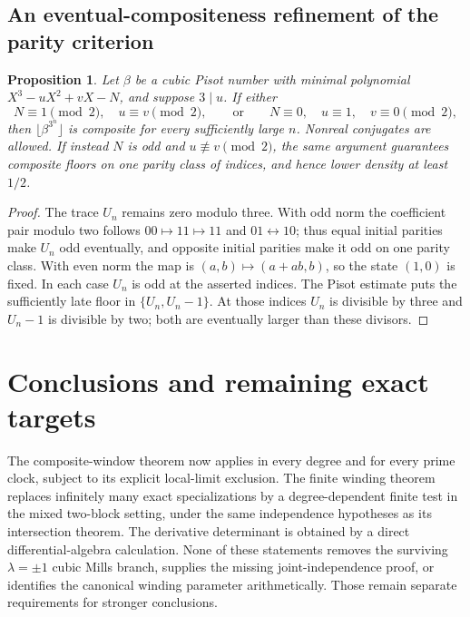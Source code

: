 \documentclass[11pt,a4paper]{article}
\newtheorem{proposition}[theorem]{Proposition}
\theoremstyle{definition}\newtheorem{definition}[theorem]{Definition}
\theoremstyle{remark}\newtheorem{remark}[theorem]{Remark}
\begin{document}
\subsection{An eventual-compositeness refinement of the parity criterion}
\begin{proposition}\label{new:prop:eventual-composite}
Let $\beta$ be a cubic Pisot number with minimal polynomial
$X^3-uX^2+vX-N$, and suppose $3\mid u$. If either
\[
 N\equiv1\pmod2,\quad u\equiv v\pmod2,
 \qquad\text{or}\qquad
 N\equiv0,\quad u\equiv1,\quad v\equiv0\pmod2,
\]
then $\lfloor\beta^{3^n}\rfloor$ is composite for every sufficiently
large $n$. Nonreal conjugates are allowed. If instead $N$ is odd
and $u\not\equiv v\pmod2$, the same argument guarantees composite
floors on one parity class of indices, and hence lower density at
least $1/2$.
\end{proposition}
\begin{proof}
The trace $U_n$ remains zero modulo three. With odd norm the
coefficient pair modulo two follows
$00\mapsto11\mapsto11$ and $01\leftrightarrow10$; thus equal
initial parities make $U_n$ odd eventually, and opposite initial
parities make it odd on one parity class. With even norm the map
is $(a,b)\mapsto(a+ab,b)$, so the state $(1,0)$ is fixed. In each
case $U_n$ is odd at the asserted indices. The Pisot estimate puts
the sufficiently late floor in $\{U_n,U_n-1\}$. At those indices
$U_n$ is divisible by three and $U_n-1$ is divisible by two; both
are eventually larger than these divisors.
\end{proof}

\section{Conclusions and remaining exact targets}
The composite-window theorem now applies in every degree and for every
prime clock, subject to its explicit local-limit exclusion. The finite
winding theorem replaces infinitely many exact specializations by a
degree-dependent finite test in the mixed two-block setting, under the
same independence hypotheses as its intersection theorem. The derivative
determinant is obtained by a direct differential-algebra calculation.
None of these statements removes the surviving $\lambda=\pm1$ cubic
Mills branch, supplies the missing joint-independence proof, or identifies
the canonical winding parameter arithmetically. Those remain separate
requirements for stronger conclusions.

\appendix
\end{document}
